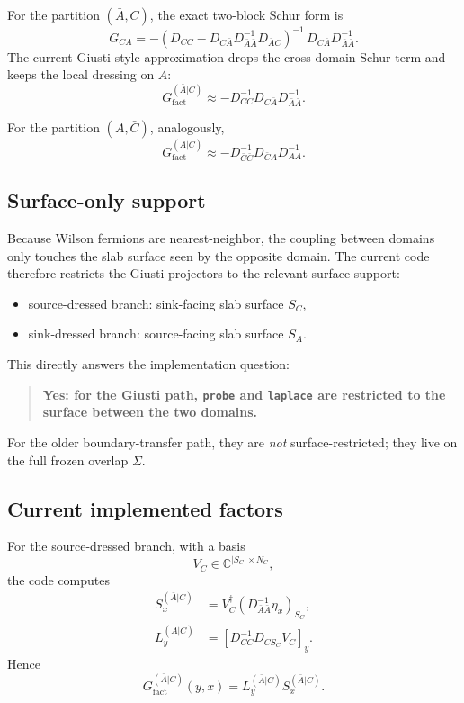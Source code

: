 \documentclass[11pt]{article}
\begin{document}
For the partition $(\bar A,C)$, the exact two-block Schur form is
\begin{equation}
G_{CA}
=
-\left(D_{CC} - D_{C\bar A} D_{\bar A\bar A}^{-1} D_{\bar A C}\right)^{-1}
\,D_{C\bar A} D_{\bar A\bar A}^{-1}.
\end{equation}
The current Giusti-style approximation drops the cross-domain Schur term and keeps
the local dressing on $\bar A$:
\begin{equation}
G_{\mathrm{fact}}^{(\bar A|C)}
\approx
- D_{CC}^{-1} D_{C\bar A} D_{\bar A\bar A}^{-1}.
\end{equation}

For the partition $(A,\bar C)$, analogously,
\begin{equation}
G_{\mathrm{fact}}^{(A|\bar C)}
\approx
- D_{\bar C\bar C}^{-1} D_{\bar C A} D_{AA}^{-1}.
\end{equation}

\subsection{Surface-only support}
Because Wilson fermions are nearest-neighbor, the coupling between domains only touches
the slab surface seen by the opposite domain. The current code therefore restricts
the Giusti projectors to the relevant surface support:
\begin{itemize}
  \item source-dressed branch: sink-facing slab surface $S_C$,
  \item sink-dressed branch: source-facing slab surface $S_A$.
\end{itemize}

This directly answers the implementation question:
\begin{quote}
\textbf{Yes: for the Giusti path, \texttt{probe} and \texttt{laplace} are restricted to the
surface between the two domains.}
\end{quote}
For the older boundary-transfer path, they are \emph{not} surface-restricted; they live on
the full frozen overlap $\Sigma$.

\subsection{Current implemented factors}
For the source-dressed branch, with a basis
\begin{equation}
V_C \in \mathbb{C}^{|S_C| \times N_C},
\end{equation}
the code computes
\begin{align}
S_x^{(\bar A|C)}
&=
V_C^\dagger \left(D_{\bar A\bar A}^{-1}\eta_x\right)_{S_C},\\
L_y^{(\bar A|C)}
&=
\left[D_{CC}^{-1} D_{C S_C} V_C\right]_y.
\end{align}
Hence
\begin{equation}
G_{\mathrm{fact}}^{(\bar A|C)}(y,x)
=
L_y^{(\bar A|C)} S_x^{(\bar A|C)}.
\end{equation}
\end{document}
